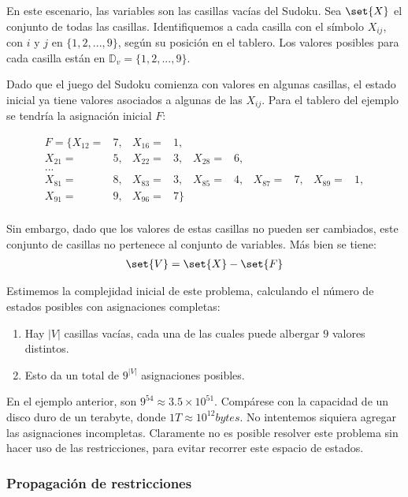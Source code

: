 En este escenario, las variables son las casillas vacías del Sudoku.  Sea $\set{X}$ el conjunto de todas las casillas.  Identifiquemos a cada casilla con el símbolo $X_{ij}$, con $i$ y $j$ en $\{1,2,...,9\}$, según su posición en el tablero.  Los valores posibles para cada casilla están en $\mathbb{D}_v = \{1,2,...,9\}$.

Dado que el juego del Sudoku comienza con valores en algunas casillas, el estado inicial ya tiene valores asociados a algunas de las $X_{ij}$.  Para el tablero del ejemplo se tendría la asignación inicial $F$:

\begin{align*}
 F = \{
 X_{12} =& 7,   &   X_{16} =& 1, \\
 X_{21} =& 5,   &   X_{22} =& 3,   &   X_{28} =& 6, \\
 ... \\
 X_{81} =& 8,   &   X_{83} =& 3,   &   X_{85} =& 4,   &   X_{87} =& 7,   &   X_{89} =& 1, \\
 X_{91} =& 9,   &   X_{96} =& 7\} \\
\end{align*}

Sin embargo, dado que los valores de estas casillas no pueden ser cambiados, este conjunto de casillas no pertenece al conjunto de variables.  Más bien se tiene:
\begin{align*}
 \set{V} = \set{X} - \set{F}
\end{align*}

Estimemos la complejidad inicial de este problema, calculando el número de estados posibles con asignaciones completas:
\begin{enumerate}
 \item Hay $|V|$ casillas vacías, cada una de las cuales puede albergar $9$ valores distintos.
 \item Esto da un total de $9^{|V|}$ asignaciones posibles.
\end{enumerate}
En el ejemplo anterior, son $9^{54} \approx 3.5\times10^{51}$.  Compárese con la capacidad de un disco duro de un terabyte, donde $1\unit{T} \approx 10^{12} \unit{bytes}$.  No intentemos siquiera agregar las asignaciones incompletas.  Claramente no es posible resolver este problema sin hacer uso de las restricciones, para evitar recorrer este espacio de estados.

\subsubsection{Propagación de restricciones}

